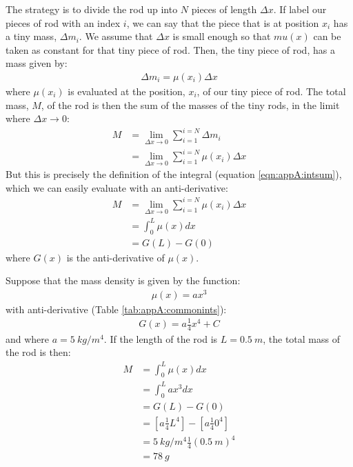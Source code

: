 The strategy is to divide the rod up into $N$ pieces of length $\Delta x$. If label our pieces of rod with an index $i$, we can say that the piece that is at position $x_i$ has a tiny mass, $\Delta m_i$. We assume that $\Delta x$ is small enough so that $mu(x)$ can be taken as constant for that tiny piece of rod. Then, the tiny piece of rod, has a mass given by:
\begin{align*}
\Delta m_i = \mu(x_i) \Delta x
\end{align*}
where $\mu(x_i)$ is evaluated at the position, $x_i$, of our tiny piece of rod. The total mass, $M$, of the rod is then the sum of the masses of the tiny rods, in the limit where $\Delta x\to 0$:
\begin{align*}
M &= \lim_{\Delta x\to 0}\sum_{i=1}^{i=N}\Delta m_i \\
  &= \lim_{\Delta x\to 0}\sum_{i=1}^{i=N} \mu(x_i) \Delta x
\end{align*}
But this is precisely the definition of the integral (equation \ref{eqn:appA:intsum}), which we can easily evaluate with an anti-derivative:
\begin{align*}
M &=\lim_{\Delta x\to 0}\sum_{i=1}^{i=N} \mu(x_i) \Delta x \\
  &= \int_0^L \mu(x) dx \\
  &= G(L) - G(0)
\end{align*}
where $G(x)$ is the anti-derivative of $\mu(x)$.

Suppose that the mass density is given by the function:
\begin{align*}
\mu(x)=ax^3
\end{align*}
with anti-derivative (Table \ref{tab:appA:commonints}):
\begin{align*}
G(x)=a\frac{1}{4}x^4 + C
\end{align*}
and where $a=\SI{5}{kg/m^4}$. If the length of the rod is $L=\SI{0.5}{m}$, the total mass of the rod is then:
\begin{align*}
M&=\int_0^L \mu(x) dx \\
&=\int_0^L ax^3 dx \\
&= G(L)-G(0)\\
&=\left[ a\frac{1}{4}L^4 \right] - \left[ a\frac{1}{4}0^4 \right]\\
&=\SI{5}{kg/m^4}\frac{1}{4}(\SI{0.5}{m})^4 \\
&=\SI{78}{g}\\
\end{align*}

